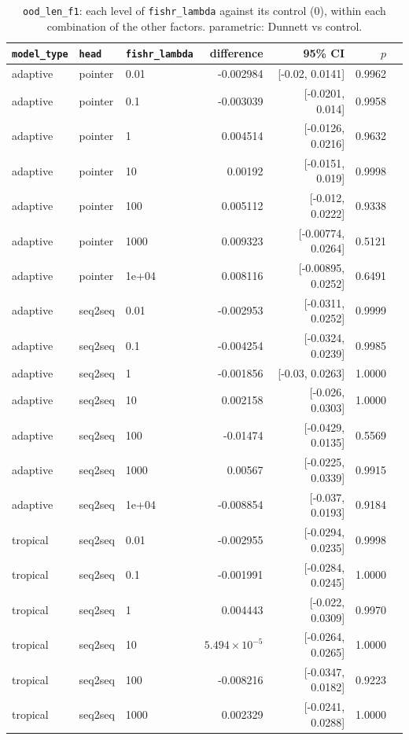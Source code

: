 \documentclass[10pt]{article}
\begin{document}
{\small
\begin{longtable}{lllrrrl}
\caption{\texttt{ood\_len\_f1}: each level of \texttt{fishr\_lambda} against its control (0), within each combination of the other factors. parametric: Dunnett vs control.}\label{tab:control-ood_len_f1}\\
\toprule
\texttt{model\_type} & \texttt{head} & \texttt{fishr\_lambda} & difference & 95\% CI & $p$ & \\
\midrule
\endhead
adaptive & pointer & 0.01 & -0.002984 & [-0.02, 0.0141] & 0.9962 & \\
adaptive & pointer & 0.1 & -0.003039 & [-0.0201, 0.014] & 0.9958 & \\
adaptive & pointer & 1 & 0.004514 & [-0.0126, 0.0216] & 0.9632 & \\
adaptive & pointer & 10 & 0.00192 & [-0.0151, 0.019] & 0.9998 & \\
adaptive & pointer & 100 & 0.005112 & [-0.012, 0.0222] & 0.9338 & \\
adaptive & pointer & 1000 & 0.009323 & [-0.00774, 0.0264] & 0.5121 & \\
adaptive & pointer & 1e+04 & 0.008116 & [-0.00895, 0.0252] & 0.6491 & \\
adaptive & seq2seq & 0.01 & -0.002953 & [-0.0311, 0.0252] & 0.9999 & \\
adaptive & seq2seq & 0.1 & -0.004254 & [-0.0324, 0.0239] & 0.9985 & \\
adaptive & seq2seq & 1 & -0.001856 & [-0.03, 0.0263] & 1.0000 & \\
adaptive & seq2seq & 10 & 0.002158 & [-0.026, 0.0303] & 1.0000 & \\
adaptive & seq2seq & 100 & -0.01474 & [-0.0429, 0.0135] & 0.5569 & \\
adaptive & seq2seq & 1000 & 0.00567 & [-0.0225, 0.0339] & 0.9915 & \\
adaptive & seq2seq & 1e+04 & -0.008854 & [-0.037, 0.0193] & 0.9184 & \\
tropical & seq2seq & 0.01 & -0.002955 & [-0.0294, 0.0235] & 0.9998 & \\
tropical & seq2seq & 0.1 & -0.001991 & [-0.0284, 0.0245] & 1.0000 & \\
tropical & seq2seq & 1 & 0.004443 & [-0.022, 0.0309] & 0.9970 & \\
tropical & seq2seq & 10 & $5.494\times10^{-5}$ & [-0.0264, 0.0265] & 1.0000 & \\
tropical & seq2seq & 100 & -0.008216 & [-0.0347, 0.0182] & 0.9223 & \\
tropical & seq2seq & 1000 & 0.002329 & [-0.0241, 0.0288] & 1.0000 & \\

\end{longtable}}
\end{document}
